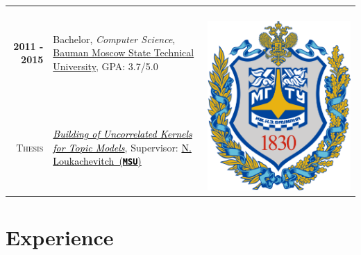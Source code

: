\documentclass[a4paper,10pt]{article} %
\begin{document}
\begin{tabular}{rp{14cm}c}	
\textbf{2011 -  2015} & Bachelor, \emph{Computer Science}, \href{http://www.bmstu.ru/en/}{Bauman Moscow State Technical University}, GPA: 3.7/5.0 & \multirow{2}{*}{~~~~~\includegraphics[scale=0.012]{img/bmstu}}\\
\textsc{Thesis} &\emph{\href{https://github.com/ars-ashuha/bigram-anchor-words}{\textcolor{black}{Building of Uncorrelated Kernels for Topic Models}}}, Supervisor:  \href{https://scholar.google.ru/citations?user=FKkWXLkAAAAJ&hl=en}{\textcolor{black}{N. Loukachevitch~(\texttt{\textbf{MSU}})}}
\end{tabular}



\section{Experience}
\end{document}
